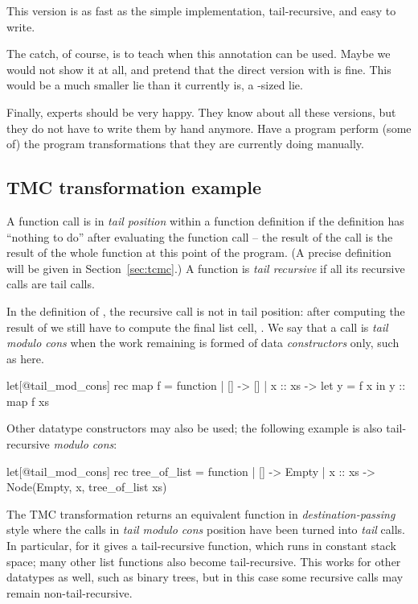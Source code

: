 This version is as fast as the simple implementation, tail-recursive,
and easy to write.

The catch, of course, is to teach when this 
annotation can be used. Maybe we would not show it at all, and pretend
that the direct  version with  is fine. This
would be a much smaller lie than it currently is,
a -sized lie.

Finally, experts should be very happy. They know about all these
versions, but they do not have to write them by hand anymore. Have
a program perform (some of) the program transformations that they are
currently doing manually.

\subsection{TMC transformation example}

A function call is in \emph{tail position} within a function
definition if the definition has ``nothing to do'' after evaluating
the function call -- the result of the call is the result of the whole
function at this point of the program. (A precise definition will be
given in Section~\ref{sec:tcmc}.) A function is \emph{tail recursive}
if all its recursive calls are tail calls.

In the definition of , the recursive call is not in tail
position: after computing the result of  we still have
to compute the final list cell, . We say that a call is
\emph{tail modulo cons} when the work remaining is formed of data
\emph{constructors} only, such as \ocaml{(::)} here.

\begin{Ocaml}
let[@tail_mod_cons] rec map f = function
| [] -> []
| x :: xs ->
  let y = f x in
  y :: map f xs
\end{Ocaml}

Other datatype constructors may also be used; the following example is
also tail-recursive \emph{modulo cons}:

\begin{Ocaml}
let[@tail_mod_cons] rec tree_of_list = function
| [] -> Empty
| x :: xs -> Node(Empty, x, tree_of_list xs)
\end{Ocaml}

The TMC transformation returns an equivalent function in
\emph{destination-passing} style where the calls in \emph{tail modulo
  cons} position have been turned into \emph{tail} calls. In
particular, for  it gives a tail-recursive function, which
runs in constant stack space; many other list functions also become
tail-recursive. This works for other datatypes as well, such as binary trees, but in this case some recursive calls may remain non-tail-recursive.

